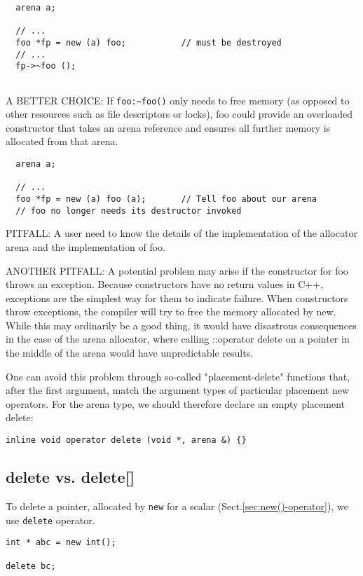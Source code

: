 \begin{verbatim}
  arena a;

  // ...
  foo *fp = new (a) foo;           // must be destroyed
  // ...
  fp->~foo ();
  
\end{verbatim}

A BETTER CHOICE: If \verb!foo:~foo()! only needs to free memory (as opposed to other
resources such as file descriptors or locks), foo could provide an overloaded
constructor that takes an arena reference and ensures all further memory is
allocated from that arena.

\begin{verbatim}
  arena a;

  // ...
  foo *fp = new (a) foo (a);       // Tell foo about our arena
  // foo no longer needs its destructor invoked
\end{verbatim}

PITFALL: A user need to know the details of the implementation of the allocator
arena and the implementation of foo.


ANOTHER PITFALL:
A potential problem may arise if the constructor for foo throws an exception.
Because constructors have no return values in C++, exceptions are the simplest
way for them to indicate failure. When constructors throw exceptions, the
compiler will try to free the memory allocated by new. While this may ordinarily
be a good thing, it would have disastrous consequences in the case of the arena
allocator, where calling ::operator delete on a pointer in the middle of the
arena would have unpredictable results.

One can avoid this problem through so-called "placement-delete" functions that,
after the first argument, match the argument types of particular placement new
operators. For the arena type, we should therefore declare an empty placement
delete:

\begin{verbatim}
inline void operator delete (void *, arena &) {}
\end{verbatim}



\subsection{delete vs. delete[]}
\label{sec:delete-operator}


To delete a pointer, allocated by \verb!new! for a scalar
(Sect.\ref{sec:new()-operator}), we use \verb!delete! operator.
\begin{verbatim}
int * abc = new int();

delete bc;
\end{verbatim}


